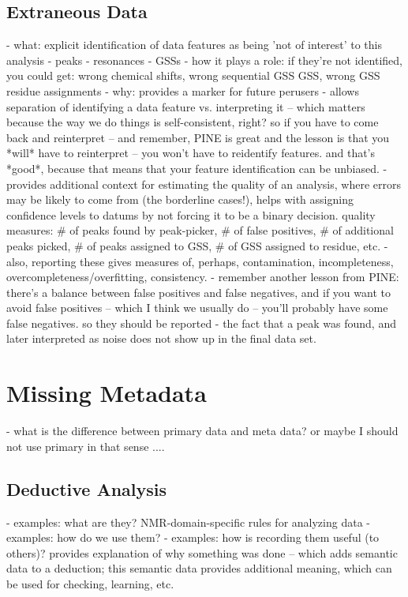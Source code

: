 \subsection{Extraneous Data}
 - what: explicit identification of data features as being 'not of interest'
   to this analysis
   - peaks
   - resonances
   - GSSs
 - how it plays a role: if they're not identified, you could get: wrong 
   chemical shifts, wrong sequential GSS GSS, wrong GSS residue assignments
 - why: provides a marker for future perusers
 - allows separation of identifying a data feature vs. interpreting it -- which
   matters because the way we do things is self-consistent, right?  
   so if you have to come back and reinterpret -- and remember, PINE is great and the
   lesson is that you *will* have to reinterpret -- you won't have to reidentify
   features.  
   and that's *good*, because that means that your feature identification
   can be unbiased.  
 - provides additional context for estimating the quality of an analysis,
   where errors may be likely to come from (the borderline cases!), helps with
   assigning confidence levels to datums by not forcing it to be a binary 
   decision.  quality measures: \# of peaks found by peak-picker, \# of false
   positives, \# of additional peaks picked, \# of peaks assigned to GSS, 
   \# of GSS assigned to residue, etc.
 - also, reporting these gives measures of, perhaps, contamination,
   incompleteness, overcompleteness/overfitting, consistency.  
 - remember another
   lesson from PINE: there's a balance between false positives and false negatives,
   and if you want to avoid false positives -- which I think we usually do -- 
   you'll probably have some false negatives.  so they should be reported
 - the fact that a peak was found, and later interpreted as noise does 
   not show up in the final data set.


\section{Missing Metadata}
 - what is the difference between primary data and meta data?  or maybe
   I should not use primary in that sense ....

\subsection{Deductive Analysis}
 - examples: what are they?  NMR-domain-specific rules for analyzing data
 - examples: how do we use them?
 - examples: how is recording them useful (to others)?
   provides explanation of why something was done -- which adds semantic data
   to a deduction; this semantic data provides additional meaning, which can
   be used for checking, learning, etc.

